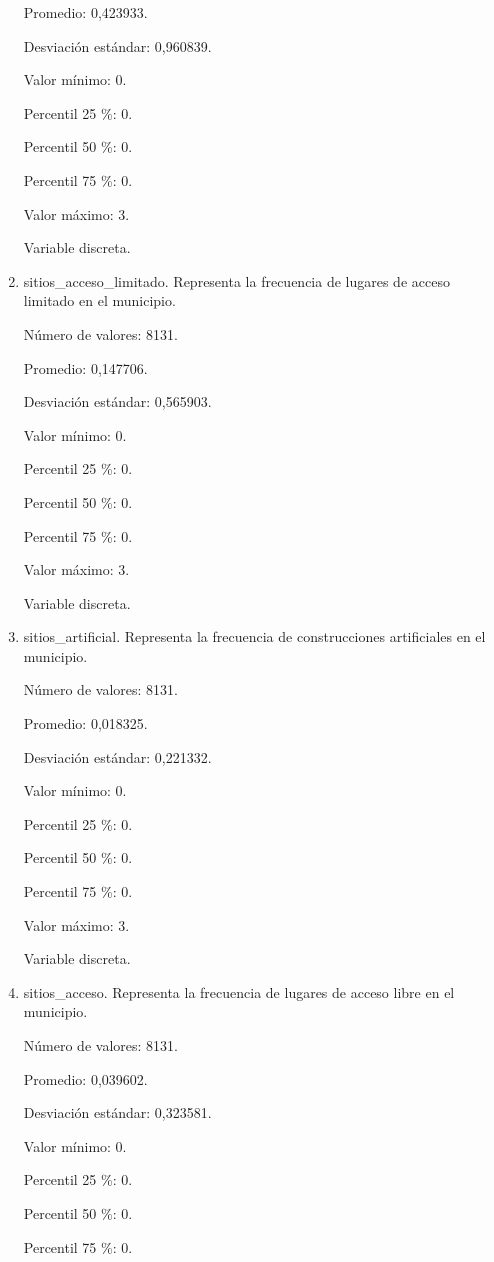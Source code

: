 \begin{enumerate}
	Promedio: 0,423933.
	
	Desviación estándar: 0,960839.
	
	Valor mínimo: 0.
	
	Percentil 25 \%: 0.
	
	Percentil 50 \%: 0.
	
	Percentil 75 \%: 0.
	
	Valor máximo: 3.
	
	Variable discreta.

	\item sitios\_acceso\_limitado. Representa la frecuencia de lugares de acceso limitado en el municipio.
	
	Número de valores: 8131.
	
	Promedio: 0,147706.
	
	Desviación estándar: 0,565903.
	
	Valor mínimo: 0.
	
	Percentil 25 \%: 0.
	
	Percentil 50 \%: 0.
	
	Percentil 75 \%: 0.
	
	Valor máximo: 3.
	
	Variable discreta.

	\item sitios\_artificial. Representa la frecuencia de construcciones artificiales en el municipio.
	
	Número de valores: 8131.
	
	Promedio: 0,018325.
	
	Desviación estándar: 0,221332.
	
	Valor mínimo: 0.
	
	Percentil 25 \%: 0.
	
	Percentil 50 \%: 0.
	
	Percentil 75 \%: 0.
	
	Valor máximo: 3.
	
	Variable discreta.

	\item sitios\_acceso. Representa la frecuencia de lugares de acceso libre en el municipio.
	
	Número de valores: 8131.
	
	Promedio: 0,039602.
	
	Desviación estándar: 0,323581.
	
	Valor mínimo: 0.
	
	Percentil 25 \%: 0.
	
	Percentil 50 \%: 0.
	
	Percentil 75 \%: 0.
	

\end{enumerate}
